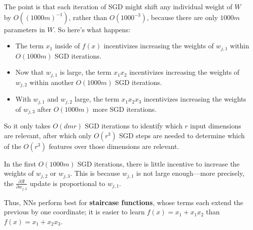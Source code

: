 The point is that each iteration of SGD
might shift any individual weight of $W$ by $O((1000m)^{-1})$,
rather than $O(1000^{-3})$,
because there are only $1000m$ parameters in $W$.
So here's what happens:
\begin{itemize}
    \item The term $x_1$ inside of $f(x)$
    incentivizes increasing the weights of $w_{j, 1}$
    within $O(1000m)$ SGD iterations.
    \item Now that $w_{j, 1}$ is large,
    the term $x_1x_2$ incentivizes
    increasing the weights of $w_{j, 2}$
    within another $O(1000m)$ SGD iterations.
    \item With $w_{j, 1}$ and $w_{j, 2}$ large,
    the term $x_1x_2x_3$ incentivizes increasing
    the weights of $w_{j, 3}$ after $O(1000m)$ more SGD iterations.
\end{itemize}
So it only takes $O(dmr)$ SGD iterations
to identify which $r$ input dimensions are relevant,
after which only $O(r^3)$ SGD steps are needed
to determine which of the $O(r^3)$ features over those
dimensions are relevant.

\begin{remark}
    In the first $O(1000m)$ SGD iterations,
    there is little incentive to increase the weights of
    $w_{j, 2}$ or $w_{j, 3}$.
    This is because $w_{j, 1}$ is not large enough---more precisely,
    the $\frac{\partial \mathcal{R}}{\partial w_{j, 2}}$ update
    is proportional to $w_{j, 1}$.

    Thus, NNs perform best for \textbf{staircase functions},
    whose terms each extend the previous by one coordinate;
    it is easier to learn $f(x) = x_1 + x_1x_2$ than $f(x) = x_1 + x_2x_3$.
\end{remark}

